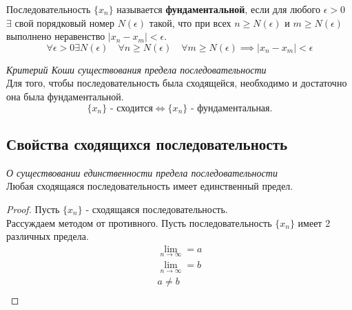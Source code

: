 \begin{definition}
  Последовательность $\{x_{n}\} $ называется \textbf{фундаментальной}, если для любого $\epsilon > 0$ $\exists $ свой порядковый номер $N(\epsilon)$ такой, что при всех $n \ge N(\epsilon)$ и $m \ge  N(\epsilon)$ выполнено неравенство $|x_{n} - x_{m}| < \epsilon$.
  \[
    \forall \epsilon > 0 \exists N(\epsilon) 
    \quad \forall n \ge N(\epsilon)
    \quad \forall m \ge N(\epsilon) 
    \implies |x_{n} - x_{m}| < \epsilon
  \]
\end{definition}

\begin{theorem}
  \textit{Критерий Коши существования предела последовательности} \\
  Для того, чтобы последовательность была сходящейся, необходимо и достаточно она была фундаментальной.
  \[
    \{x_{n}\} \text{ - сходится} \iff \{x_{n}\} \text{ - фундаментальная}
  .\] 
\end{theorem}

\subsection{Свойства сходящихся последовательность}

\begin{theorem}
  \textit{О существовании единственности предела последовательности} \\
  Любая сходящаяся последовательность имеет единственный предел.
\end{theorem}
\begin{proof}
  Пусть $\{x_{n}\} $ - сходящаяся последовательность. \\
  Рассуждаем методом от противного. Пусть последовательность $\{x_{n}\} $ имеет 2 различных предела.
  \begin{gather*}
    \lim_{n \to \infty} = a \\
    \lim_{n \to \infty} = b \\
    a \neq b \\
  \end{gather*}
\end{proof}

